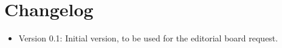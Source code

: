 \section{Changelog}

\begin{itemize}
\item Version 0.1: Initial version, to be used for the editorial board request.
\end{itemize}